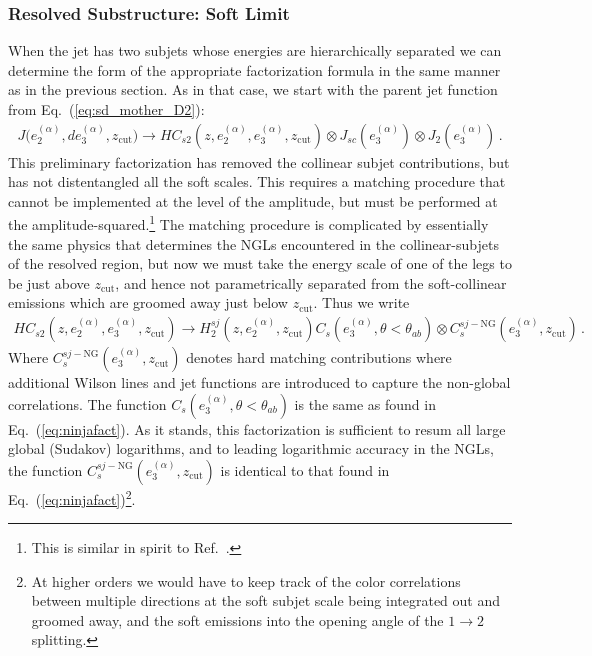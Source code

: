 \documentclass[a4paper,11pt]{article}
\newcommand{\ecf}[2]{e_{#1}^{(#2)}}
\def\zcut{z_{\text{cut}}}
\DeclareRobustCommand{\Eq}[1]{Eq.~(\ref{#1})}
\DeclareRobustCommand{\Ref}[1]{Ref.~\cite{#1}}
\begin{document}
\subsubsection{Resolved Substructure: Soft Limit}\label{sec:resolved_soft}


When the jet has two subjets whose energies are hierarchically separated we can determine the form of the appropriate factorization formula in the same manner as in the previous section. As in that case, we start with the parent jet function from \Eq{eq:sd_mother_D2}:
\begin{align}
J\big(\ecf{2}{\alpha},d\ecf{3}{\alpha},\zcut\big) \to HC_{s2}(z,\ecf{2}{\alpha},\ecf{3}{\alpha},\zcut)\otimes J_{sc}(\ecf{3}{\alpha})\otimes J_2(\ecf{3}{\alpha})\,.
\end{align}
This preliminary factorization has removed the collinear subjet contributions, but has not distentangled all the soft scales. This requires a matching procedure that cannot be implemented at the level of the amplitude, but must be performed at the amplitude-squared.\footnote{This is similar in spirit to \Ref{Neill:2015nya}.} The matching procedure is complicated by essentially the same physics that determines the NGLs encountered in the collinear-subjets of the resolved region, but now we must take the energy scale of one of the legs to be just above $\zcut$, and hence not parametrically separated from the soft-collinear emissions which are groomed away just below $\zcut$. Thus we write
\begin{align}\label{eq:soft_jet_factorization}
 HC_{s2}(z,\ecf{2}{\alpha},\ecf{3}{\alpha},\zcut)\to H_{2}^{sj}(z,\ecf{2}{\alpha},\zcut)C_s(\ecf{3}{\alpha},\theta<\theta_{ab})\otimes C_s^{sj-\text{NG}}(\ecf{3}{\alpha},\zcut)\,.
\end{align}
Where $C_s^{sj-\text{NG}}(\ecf{3}{\alpha},\zcut)$ denotes hard matching contributions where additional Wilson lines and jet functions are introduced to capture the non-global correlations. The function $C_s(\ecf{3}{\alpha},\theta<\theta_{ab})$ is the same as found in \Eq{eq:ninjafact}. As it stands, this factorization is sufficient to resum all large global (Sudakov) logarithms, and to leading logarithmic accuracy in the NGLs, the function $C_s^{sj-\text{NG}}(\ecf{3}{\alpha},\zcut)$ is identical to that found in \Eq{eq:ninjafact}\footnote{At higher orders we would have to keep track of the color correlations between multiple directions at the soft subjet scale being integrated out and groomed away, and the soft emissions into the opening angle of the $1\rightarrow 2$ splitting.}.
\end{document}
